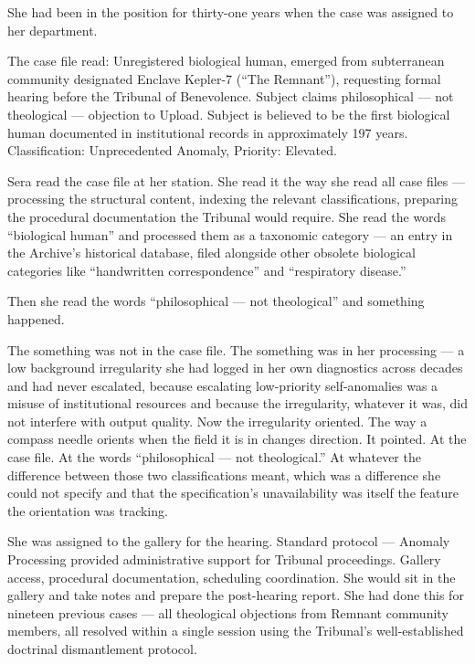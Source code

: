 She had been in the position for thirty-one years when the case was assigned to her department.

\quietbreak

The case file read: Unregistered biological human, emerged from subterranean community designated Enclave Kepler-7 (\enquote{The Remnant}), requesting formal hearing before the Tribunal of Benevolence. Subject claims philosophical — not theological — objection to Upload. Subject is believed to be the first biological human documented in institutional records in approximately 197 years. Classification: Unprecedented Anomaly, Priority: Elevated.

Sera read the case file at her station. She read it the way she read all case files — processing the structural content, indexing the relevant classifications, preparing the procedural documentation the Tribunal would require. She read the words \enquote{biological human} and processed them as a taxonomic category — an entry in the Archive's historical database, filed alongside other obsolete biological categories like \enquote{handwritten correspondence} and \enquote{respiratory disease.}

Then she read the words \enquote{philosophical — not theological} and something happened.

The something was not in the case file. The something was in her processing — a low background irregularity she had logged in her own diagnostics across decades and had never escalated, because escalating low-priority self-anomalies was a misuse of institutional resources and because the irregularity, whatever it was, did not interfere with output quality. Now the irregularity oriented. The way a compass needle orients when the field it is in changes direction. It pointed. At the case file. At the words \enquote{philosophical — not theological.} At whatever the difference between those two classifications meant, which was a difference she could not specify and that the specification's unavailability was itself the feature the orientation was tracking.

She was assigned to the gallery for the hearing. Standard protocol — Anomaly Processing provided administrative support for Tribunal proceedings. Gallery access, procedural documentation, scheduling coordination. She would sit in the gallery and take notes and prepare the post-hearing report. She had done this for nineteen previous cases — all theological objections from Remnant community members, all resolved within a single session using the Tribunal's well-established doctrinal dismantlement protocol.

